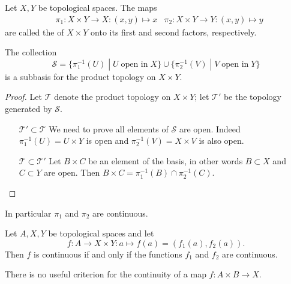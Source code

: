 \begin{definition}
Let $X,Y$ be topological spaces. The maps
\begin{align*}
&\pi_1: X\times Y\to X: (x,y)\mapsto x
&\pi_2: X\times Y\to Y: (x,y)\mapsto y
\end{align*}
are called the  of $X\times Y$ onto its first and second factors, respectively.
\end{definition}
\begin{proposition}
The collection
\[ \mathcal{S} = \{ \pi_1^{-1}(U)\;|\; U\;\text{open in}\; X \}\cup \{ \pi_2^{-1}(V)\;|\; V\;\text{open in}\;Y  \} \]
is a subbasis for the product topology on $X\times Y$.
\end{proposition}
\begin{proof}
Let $\mathcal{T}$ denote the product topology on $X\times Y$; let $\mathcal{T'}$ be the topology generated by $\mathcal{S}$.
\begin{itemize}[leftmargin=2cm]
\item[$\boxed{\mathcal{T}'\subset\mathcal{T}}$] We need to prove all elements of $\mathcal{S}$ are open. Indeed $\pi_1^{-1}(U) = U\times Y$ is open and $\pi_2^{-1}(V) = X\times V$ is also open.
\item[$\boxed{\mathcal{T}\subset\mathcal{T}'}$] Let $B\times C$ be an element of the basis, in other words $B\subset X$ and $C\subset Y$ are open. Then $B\times C = \pi_1^{-1}(B)\cap \pi_2^{-1}(C)$.
\end{itemize}
\end{proof}
In particular $\pi_1$ and $\pi_2$ are continuous.
\begin{proposition}\label{continuityCompositeFunctions}
Let $A,X,Y$ be topological spaces and let
\[ f:A\to X\times Y: a\mapsto f(a) = (f_1(a),f_2(a)). \]
Then $f$ is continuous \textup{if and only if} the functions $f_1$ and $f_2$ are continuous.
\end{proposition}
There is no useful criterion for the continuity of a map $f:A\times B \to X$.

